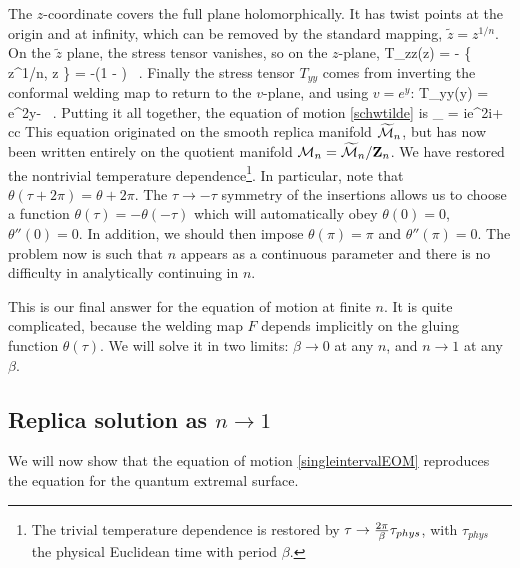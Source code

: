 The $z$-coordinate covers the full plane holomorphically. It has twist points at the origin and at infinity, which can be removed by the standard mapping, $\tilde{z} = z^{1/n}$. On the $\tilde{z}$ plane, the stress tensor vanishes, so on the $z$-plane,
\be
T_{zz}(z) = - \{ z^{1/n}, z \} = -\left(1 - \right)  \ .
\ee
Finally the stress tensor $T_{yy}$ comes from inverting the conformal welding map to return to the $v$-plane, and using $v = e^{y}$:
\be
T_{yy}(y) = e^{2y}  - \half \ .
\ee
Putting it all together, the equation of motion \eqref{schwtilde} is
\be \label{singleintervalEOM}
\p_\tau
{} = 
ie^{2i\tau}  + cc
\ee
This equation originated on the smooth replica manifold $\widetilde{{\cal M}}_n$, but has now been written entirely on the quotient manifold ${\cal M}_{n} = \widetilde{{\cal M}}_n/\mathbf{Z}_n$.  We have restored the nontrivial temperature dependence\footnote{The trivial temperature dependence is restored by $\tau \to {  2 \pi \over \beta }\tau_{phys}$, with $\tau_{phys}$ the physical Euclidean time with period $\beta$.}. In particular, note that $\theta(\tau+ 2\pi) = \theta + 2 \pi$. The $\tau \rightarrow -\tau$ symmetry of the insertions allows us to choose a function $\theta(\tau) = - \theta(-\tau)$ which will automatically obey $\theta(0)=0$, $\theta''(0)=0$. In addition, we should then impose $\theta(\pi) = \pi$ and $\theta''(\pi) =0$. The problem now is such that $n$ appears as a continuous parameter and there is no difficulty in analytically continuing in $n$. 

This is our final answer for the equation of motion at finite $n$. It is quite complicated, because the welding map $F$ depends implicitly on the gluing function $\theta(\tau)$.  We will solve it in two limits: $\beta \to 0$ at any $n$, and $n \to 1$ at any $\beta$.



\subsection{Replica solution as $n \to 1$}

We will now show that the equation of motion \eqref{singleintervalEOM} reproduces the equation for the quantum extremal surface.


